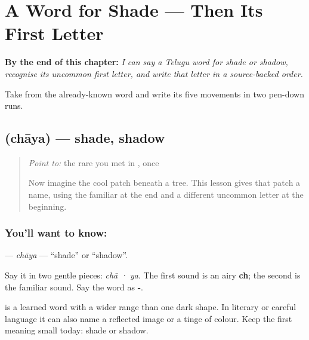 
\chapter{A Word for Shade — Then Its First Letter}
\label{ch:te-chhaya-chha}

\begin{chapteropening}
\textbf{By the end of this chapter:} \emph{I can say a Telugu word for shade or shadow, recognise its uncommon first letter, and write that letter in a source-backed order.}

Take  from the already-known word  and write its five movements in two pen-down runs.
\end{chapteropening}

\section[\texorpdfstring{\te{ఛాయ} (chāya)}{ఛాయ (chāya)}]{ (chāya) — shade, shadow}

\label{lesson:TE-C151-chhaya}



\begin{quote}
\emph{Point to:} the rare \textbf{} you met in \textbf{}, once

Now imagine the cool patch beneath a tree. This lesson gives that patch a name, using the familiar \textbf{} at the end and a different uncommon letter at the beginning.
\end{quote}

\subsection*{You'll want to know: }
\textbf{} — \emph{chāya} — \textquotedblleft{}shade\textquotedblright{} or \textquotedblleft{}shadow\textquotedblright{}.

Say it in two gentle pieces: \emph{chā · ya}. The first sound is an airy \textbf{ch}; the second is the familiar \textbf{} sound. Say the word as \textbf{-}.

\textbf{} is a learned word with a wider range than one dark shape. In literary or careful language it can also name a reflected image or a tinge of colour. Keep the first meaning small today: shade or shadow.

